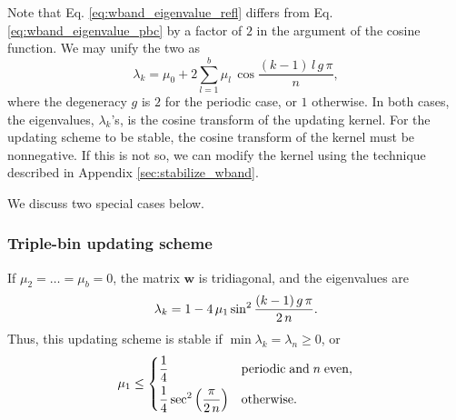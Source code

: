 \documentclass[reprint, floatfix]{revtex4-1}
\begin{document}
Note that Eq. \eqref{eq:wband_eigenvalue_refl}
differs from Eq. \eqref{eq:wband_eigenvalue_pbc}
by a factor of $2$
in the argument of the cosine function.
%
We may unify the two as
%
\begin{equation}
  \lambda_k
  =
  \mu_0
  +
  2
  \sum_{ l = 1 }^b
    \mu_l \,
    \cos \frac{ (k - 1) \, l \, g \, \pi }
              {            n             }
  ,
  \label{eq:wband_eigenvalue}
\end{equation}
%
where the degeneracy $g$ is $2$
for the periodic case,
or $1$ otherwise.
%
In both cases,
the eigenvalues, $\lambda_k$'s,
is the cosine transform of
the updating kernel.
%
For the updating scheme to be stable,
the cosine transform of the kernel
must be nonnegative.
%
If this is not so,
we can modify the kernel
using the technique described
in Appendix \ref{sec:stabilize_wband}.

We discuss two special cases below.



\subsubsection{\label{sec:nnscheme}
Triple-bin updating scheme}



If $\mu_2 = \dots = \mu_b = 0$,
the matrix $\mathbf w$ is tridiagonal,
and the eigenvalues are
\begin{equation}
  \lambda_k
  =
  1 -
  4 \, \mu_1 \sin^2
  \frac{ (k - 1) \, g \, \pi }
       {       2 \, n        }
  .
\notag
\end{equation}
%
Thus, this updating scheme is stable if
$\min \lambda_k = \lambda_n \ge 0$,
or
\begin{equation}
  \mu_1 \le
  \begin{dcases}
    \frac 1 4
    & \mathrm{periodic \; and \;} n \mathrm{ \; even,}
    \\
    \frac 1 4
    \sec^2
    \left( \frac{  \pi   }
                { 2 \, n }
    \right)
    & \mathrm{otherwise}.
  \end{dcases}
\notag
\end{equation}
\end{document}
